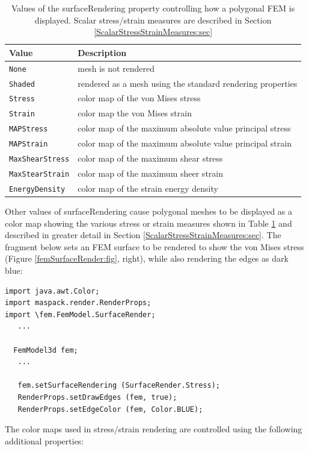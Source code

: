 \begin{table}[ht]
\caption{Values of the {\sf surfaceRendering} property
controlling how a polygonal FEM is displayed. Scalar stress/strain
measures are described in
Section \ref{ScalarStressStrainMeasures:sec}}
\begin{center}
\begin{tabular}{ll}
\hline
Value & Description\\
\hline
{\tt None} & mesh is not rendered\\
{\tt Shaded} & rendered as a mesh using the standard rendering properties\\
{\tt Stress} & color map of the von Mises stress\\
{\tt Strain} & color map the von Mises strain\\
{\tt MAPStress} & color map of the maximum absolute value principal stress\\
{\tt MAPStrain} & color map of the maximum absolute value principal strain\\
{\tt MaxShearStress} & color map of the maximum shear stress\\
{\tt MaxStearStrain} & color map of the maximum sheer strain\\
{\tt EnergyDensity} & color map of the strain energy density\\
\hline
\end{tabular}
\end{center}
\label{surfaceRendering:tab}
\end{table}
%
Other values of {\sf surfaceRendering} cause polygonal meshes to be
displayed as a color map showing the various stress or strain measures
shown in Table \ref{surfaceRendering:tab} and described in greater
detail in Section \ref{ScalarStressStrainMeasures:sec}.  The fragment
below sets an FEM surface to be rendered to show the von Mises stress
(Figure \ref{femSurfaceRender:fig}, right), while also rendering the
edges as dark blue:
%
\begin{lstlisting}[]
import java.awt.Color;
import maspack.render.RenderProps;
import \fem.FemModel.SurfaceRender;
   ...

  FemModel3d fem;
   ...

   fem.setSurfaceRendering (SurfaceRender.Stress);
   RenderProps.setDrawEdges (fem, true);
   RenderProps.setEdgeColor (fem, Color.BLUE);
\end{lstlisting}
%
The color maps used in stress/strain rendering are controlled using
the following additional properties:

